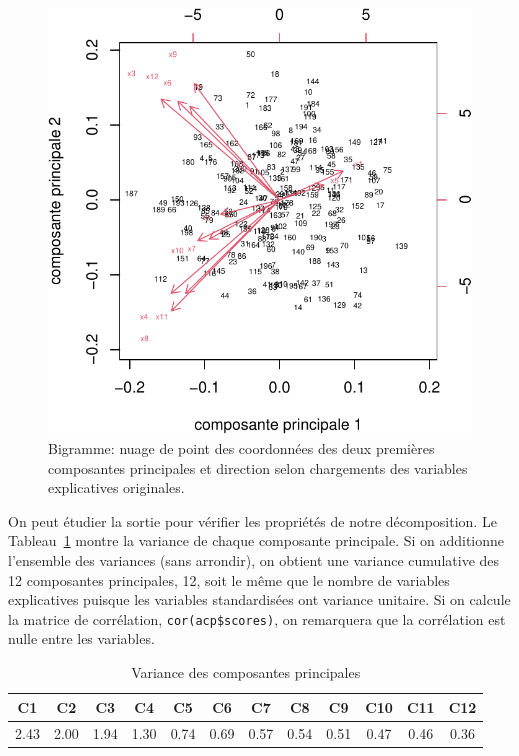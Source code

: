 \documentclass[
  11pt,
  letterpaper,
]{book}
\theoremstyle{definition}
\theoremstyle{remark}
\begin{document}
\begin{figure}[ht!]

{\centering \includegraphics[width=1\textwidth,height=\textheight]{./02-analysefactorielle_files/figure-pdf/fig-biplot-1.pdf}

}

\caption{\label{fig-biplot}Bigramme: nuage de point des coordonnées des
deux premières composantes principales et direction selon chargements
des variables explicatives originales.}

\end{figure}

On peut étudier la sortie pour vérifier les propriétés de notre
décomposition. Le Tableau~\ref{tbl-eigenvalues} montre la variance de
chaque composante principale. Si on additionne l'ensemble des variances
(sans arrondir), on obtient une variance cumulative des 12 composantes
principales, 12, soit le même que le nombre de variables explicatives
puisque les variables standardisées ont variance unitaire. Si on calcule
la matrice de corrélation, \texttt{cor(acp\$scores)}, on remarquera que
la corrélation est nulle entre les variables.

\hypertarget{tbl-eigenvalues}{}
\begin{table}
\caption{\label{tbl-eigenvalues}Variance des composantes principales }\tabularnewline

\centering
\begin{tabular}{cccccccccccc}
\toprule
C1 & C2 & C3 & C4 & C5 & C6 & C7 & C8 & C9 & C10 & C11 & C12\\
\midrule
2.43 & 2.00 & 1.94 & 1.30 & 0.74 & 0.69 & 0.57 & 0.54 & 0.51 & 0.47 & 0.46 & 0.36\\
\bottomrule
\end{tabular}
\end{table}
\end{document}
